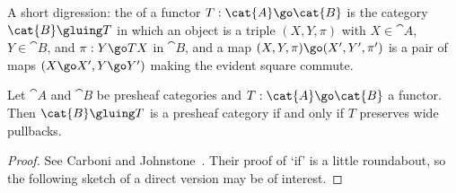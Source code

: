 A short digression: the %
%
%
%
%
of a functor $T: \cat{A} \go \cat{B}$ is the category
$\cat{B}\gluing T$ in which an object is a triple $(X, Y, \pi)$ with
$X\in\cat{A}$, $Y\in\cat{B}$, and $\pi: Y \go TX$ in $\cat{B}$, and a map
$(X, Y, \pi) \go (X', Y', \pi')$ is a pair of maps $(X\go X', Y\go Y')$
making the evident square commute.
%
\begin{propn}	%
%
%
%
%
Let $\cat{A}$ and $\cat{B}$ be presheaf categories and $T: \cat{A} \go
\cat{B}$ a functor.  Then $\cat{B}\gluing T$ is a presheaf category if
and only if $T$ preserves wide pullbacks.  
\end{propn}
%
\begin{proof}
See Carboni and Johnstone~\cite[4.4(v)]{CJ}.  Their proof of `if' is a
little roundabout, so the following sketch of a direct version may be of
interest.


\end{proof}
